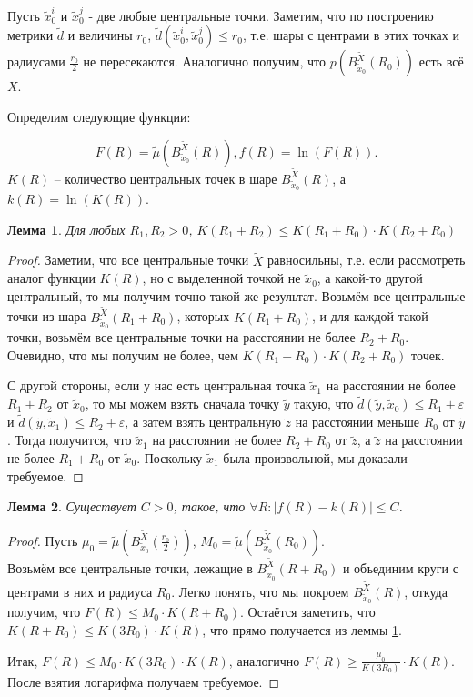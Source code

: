 \documentclass[11pt]{article}
\theoremstyle{definition}
\theoremstyle{plain}
\theoremstyle{plain}
\newtheorem{lemma}{Лемма}
\def\leq{\leqslant}
\def\geq{\geqslant}
\def\wt#1{\widetilde{#1}}
\def\wtB#1{B_{\wt{x}_0}^{\wt{X}}(#1)}
\begin{document}
Пусть $\wt{x}_0^i$ и $\wt{x}_0^j$ - две любые центральные точки.
Заметим, что по построению метрики $\wt{d}$ и величины $r_0$, $\wt{d}(\wt{x}_0^i, \wt{x}_0^j) \leq r_0$, т.е. шары
с центрами в этих точках и радиусами $\frac{r_0}{2}$ не пересекаются.
Аналогично получим, что $p \left(B_{\wt{x}_0}^{\wt{X}} (R_0) \right)$ есть всё $X$.



Определим следующие функции:

$$
F(R)=\wt{\mu}\left(B_{\wt{x}_0}^{\wt{X}}(R)\right),
f(R)=\ln(F(R)).
$$
$K(R)$ -- количество центральных точек в шаре $B_{\wt{x}_0}^{\wt{X}} (R)$, а $k(R) = \ln(K(R))$.

\begin{lemma}\label{l_K_1}
Для любых $R_1, R_2 > 0$, $K(R_1 + R_2) \leq K(R_1+R_0) \cdot K(R_2+R_0)$
\end{lemma}

\begin{proof}
Заметим, что все центральные точки $\wt{X}$ равносильны, т.е. если рассмотреть аналог функции $K(R)$, но с выделенной точкой не $\wt{x}_0$, 
а какой-то другой центральный, то мы получим точно такой же результат. Возьмём все центральные точки из шара $\wtB{R_1 + R_0}$, которых $K(R_1 + R_0)$,
и для каждой такой точки, возьмём все центральные точки на расстоянии не более $R_2 + R_0$. 
Очевидно, что мы получим не более, чем $K(R_1+R_0) \cdot K(R_2+R_0)$ точек. 

С другой стороны, если у нас есть центральная точка $\wt{x}_1$ на расстоянии не более $R_1 + R_2$ от $\wt{x}_0$, то мы можем взять сначала точку 
$\wt{y}$ такую, что $\wt{d}(\wt{y}, \wt{x}_0) \leq R_1 + \varepsilon$ и $\wt{d}(\wt{y}, \wt{x}_1) \leq R_2 + \varepsilon$,
а затем взять центральную $\wt{z}$ на расстоянии меньше $R_0$ от $\wt{y}$. 
Тогда получится, что $\wt{x}_1$ на расстоянии не более $R_2 + R_0$ от $\wt{z}$, а $\wt{z}$ на расстоянии не более $R_1 + R_0$ от $\wt{x}_0$.
Поскольку $\wt{x}_1$ была произвольной, мы доказали требуемое.
\end{proof}

\begin{lemma}\label{l_K_2}
Существует $C > 0$, такое, что $\forall R : |f(R) - k(R)| \leq C$.
\end{lemma}

\begin{proof}
Пусть $\mu_0 =  \wt{\mu}\left( B_{\wt{x}_0}^{\wt{X}}(\frac{r_0}{2}) \right)$, 
$M_0 =  \wt{\mu}\left( B_{\wt{x}_0}^{\wt{X}}(R_0) \right)$.\\
Возьмём все центральные точки, лежащие в $B_{\wt{x}_0}^{\wt{X}}(R + R_0)$ 
и объединим круги с центрами в них и радиуса $R_0$. Легко понять, что мы покроем $B_{\wt{x}_0}^{\wt{X}}(R)$, откуда получим, 
что $F(R) \leq M_0\cdot K(R + R_0)$. Остаётся заметить, что $K(R + R_0) \leq K(3 R_0) \cdot K(R)$, что прямо получается из леммы \ref{l_K_1}. 

Итак, $F(R) \leq M_0\cdot K(3 R_0) \cdot K(R)$, аналогично $F(R) \geq \frac{\mu_0}{K(3 R_0)}\cdot K(R)$. 
После взятия логарифма получаем требуемое.
\end{proof}
\end{document}
